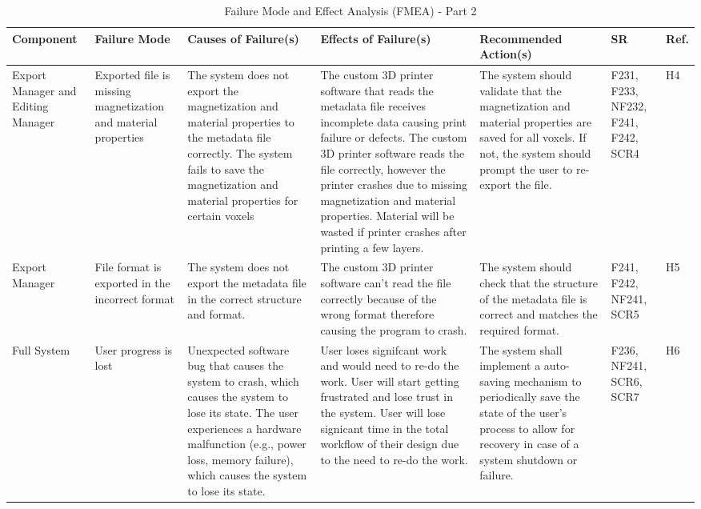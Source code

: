 \documentclass{article}
\begin{document}
\begin{landscape}
\begin{table}[H]
\centering
\caption{Failure Mode and Effect Analysis (FMEA) - Part 2}
\renewcommand{\arraystretch}{1.1} 
\footnotesize 
\begin{tabular}{|p{3cm}|p{3cm}|p{3.8cm}|p{3.8cm}|p{5.5cm}|p{2cm}|p{1cm}|}
\hline
\textbf{Component} & \textbf{Failure Mode} & \textbf{Causes of Failure(s)} & \textbf{Effects of Failure(s)} & \textbf{Recommended Action(s)} & \textbf{SR} & \textbf{Ref.} \\
\hline
Export Manager and Editing Manager & Exported file is missing magnetization and material properties& \textbullet{} The system does not export the magnetization and material properties to the metadata file correctly. \newline \textbullet{} The system fails to save the magnetization and material properties for certain voxels & \textbullet{} The custom 3D printer software that reads the metadata file receives incomplete data causing print failure or defects. \newline \textbullet{} The custom 3D printer software reads the file correctly, however the printer crashes due to missing magnetization and material properties. \newline \textbullet{} Material will be wasted if printer crashes after printing a few layers. & The system should validate that the magnetization and material properties are saved for all voxels. If not, the system should prompt the user to re-export the file. & F231, F233, NF232, F241, F242, SCR4 & H4 \\
\hline
Export Manager & File format is exported in the incorrect format & \textbullet{} The system does not export the metadata file in the correct structure and format. & The custom 3D printer software can't read the file correctly because of the wrong format therefore causing the program to crash. & The system should check that the structure of the metadata file is correct and matches the required format. & F241, F242, NF241, SCR5 & H5 \\
\hline
Full System & User progress is lost & \textbullet{} Unexpected software bug that causes the system to crash, which causes the system to lose its state. \newline \textbullet{} The user experiences a hardware malfunction (e.g., power loss, memory failure), which causes the system to lose its state. & \textbullet{} User loses signifcant work and would need to re-do the work. \newline \textbullet{} User will start getting frustrated and lose trust in the system. \newline \textbullet{} User will lose signicant time in the total workflow of their design due to the need to re-do the work. & The system shall implement a auto-saving mechanism to periodically save the state of the user's process to allow for recovery in case of a system shutdown or failure. & F236, NF241, SCR6, SCR7 & H6 \\
\hline
\end{tabular}
\end{table}
\end{landscape}
\restoregeometry
\end{document}
